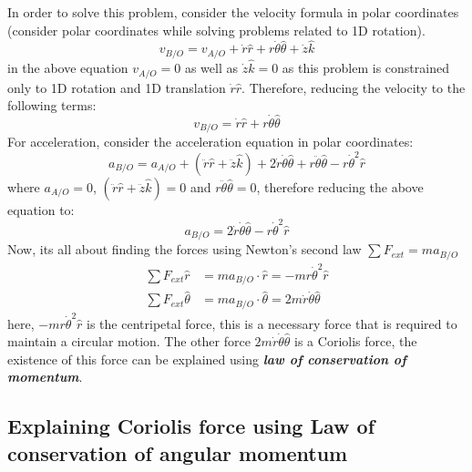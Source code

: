 In order to solve this problem, consider the velocity formula in polar coordinates (consider polar coordinates while solving problems related to 1D rotation).
\begin{equation}
	v_{B/O} = v_{A/O} + \dot{r}\hat{r} + r \dot{\theta} \hat{\theta} + \dot{z}\hat{k}
\end{equation}
in the above equation $v_{A/O} = 0$ as well as $\dot{z}\hat{k} = 0$ as this problem is constrained only to 1D rotation and 1D translation $\dot{r}\hat{r}$. Therefore, reducing the velocity to the following terms:
\begin{equation}
	v_{B/O} = \dot{r}\hat{r} + r \dot{\theta} \hat{\theta}
\end{equation}
For acceleration, consider the acceleration equation in polar coordinates:
\begin{equation}
a_{B/O} = a_{A/O} + (\ddot{r}\hat{r} + \ddot{z}\hat{k}) + 2 \dot{r} \dot{\theta} \hat{\theta} +  r \ddot{\theta} \hat{\theta} - r \dot{\theta}^{2} \hat{r}
\end{equation}
where $a_{A/O} = 0$, $(\ddot{r}\hat{r} + \ddot{z}\hat{k}) = 0$ and $r \ddot{\theta} \hat{\theta} = 0$, therefore reducing the above equation to:
\begin{equation}
	a_{B/O} = 2 \dot{r} \dot{\theta} \hat{\theta} - r \dot{\theta}^{2} \hat{r}
\end{equation}
Now, its all about finding the forces using Newton's second law $\sum F_{ext} = m a_{B/O}$
\begin{align}
	\sum F_{ext} \hat{r} &= m a_{B/O} \cdot \hat{r} = - m r \dot{\theta}^{2} \hat{r} \\
	\sum F_{ext} \hat{\theta} &= m a_{B/O} \cdot \hat{\theta} = 2 m \dot{r} \dot{\theta} \hat{\theta}
\end{align}
here, $- m r \dot{\theta}^{2} \hat{r}$ is the centripetal force, this is a necessary force that is required to maintain a circular motion. The other force $2 m \dot{r} \dot{\theta} \hat{\theta}$ is a Coriolis force, the existence of this force can be explained using \textbf{\textit{law of conservation of momentum}}.

\subsection{Explaining Coriolis force using Law of conservation of angular momentum}

